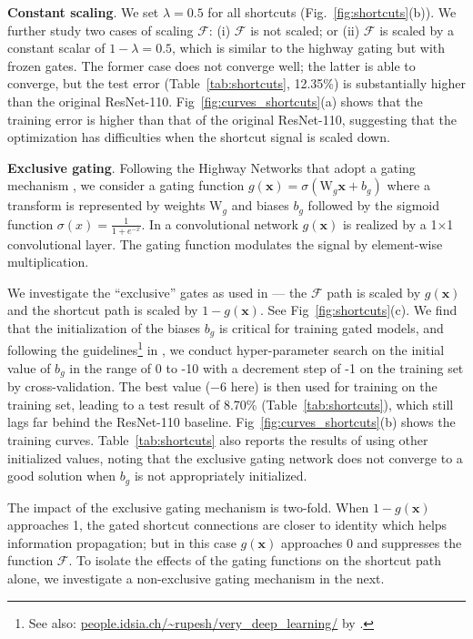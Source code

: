 \documentclass[runningheads]{llncs}
\newcommand{\ve}[1]{\mathbf{#1}} %
\newcommand{\ma}[1]{\mathrm{#1}} %
\begin{document}
\textbf{Constant scaling}. We set $\lambda=0.5$ for all shortcuts (Fig.~\ref{fig:shortcuts}(b)). We further study two cases of scaling $\mathcal{F}$: (i) $\mathcal{F}$ is not scaled; or (ii) $\mathcal{F}$ is scaled by a constant scalar of $1-\lambda=0.5$, which is similar to the highway gating \cite{Srivastava2015,Srivastava2015a} but with frozen gates. The former case does not converge well; the latter is able to converge, but the test error (Table~\ref{tab:shortcuts}, 12.35\%) is substantially higher than the original ResNet-110. Fig~\ref{fig:curves_shortcuts}(a) shows that the training error is higher than that of the original ResNet-110, suggesting that the optimization has difficulties when the shortcut signal is scaled down.

\textbf{Exclusive gating}. Following the Highway Networks \cite{Srivastava2015,Srivastava2015a} that adopt a gating mechanism \cite{Hochreiter1997},
we consider a gating function $g(\ve{x})=\sigma(\ma{W}_g\ve{x}+b_g)$ where a transform is represented by weights $\ma{W}_g$ and biases $b_g$ followed by the sigmoid function $\sigma(x)=\frac{1}{1+e^{-x}}$. In a convolutional network $g(\ve{x})$ is realized by a 1$\times$1 convolutional layer. The gating function modulates the signal by element-wise multiplication.

We investigate the ``exclusive'' gates as used in \cite{Srivastava2015,Srivastava2015a} --- the $\mathcal{F}$ path is scaled by $g(\ve{x})$ and the shortcut path is scaled by $1-g(\ve{x})$. See Fig~\ref{fig:shortcuts}(c). We find that the initialization of the biases $b_g$ is critical for training gated models, and following the guidelines\footnote{See also: \url{people.idsia.ch/~rupesh/very_deep_learning/} by \cite{Srivastava2015,Srivastava2015a}.} in \cite{Srivastava2015,Srivastava2015a}, we conduct hyper-parameter search on the initial value of $b_g$ in the range of 0 to -10 with a decrement step of -1 on the training set by cross-validation. The best value ($-6$ here) is then used for training on the training set, leading to a test result of 8.70\% (Table~\ref{tab:shortcuts}), which still lags far behind the ResNet-110 baseline. Fig~\ref{fig:curves_shortcuts}(b) shows the training curves.
Table~\ref{tab:shortcuts} also reports the results of using other initialized values, noting that the exclusive gating network does not converge to a good solution when $b_g$ is not appropriately initialized.

The impact of the exclusive gating mechanism is two-fold. When $1-g(\ve{x})$ approaches 1, the gated shortcut connections are closer to identity which helps information propagation; but in this case $g(\ve{x})$ approaches 0 and suppresses the function $\mathcal{F}$. To isolate the effects of the gating functions on the shortcut path alone, we investigate a non-exclusive gating mechanism in the next.
\end{document}
